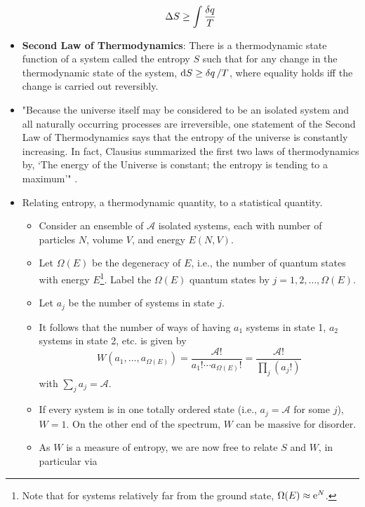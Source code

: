 \documentclass[../notes.tex]{subfiles}
\begin{document}
\begin{itemize}
    \begin{equation*}
        \Delta S \geq \int\frac{\var{q}}{T}
    \end{equation*}
    \item \textbf{Second Law of Thermodynamics}: There is a thermodynamic state function of a system called the entropy $S$ such that for any change in the thermodynamic state of the system, $\dd{S}\geq\var{q}/T$, where equality holds iff the change is carried out reversibly.
    \item "Because the universe itself may be considered to be an isolated system and all naturally occurring processes are irreversible, one statement of the Second Law of Thermodynamics says that the entropy of the universe is constantly increasing. In fact, Clausius summarized the first two laws of thermodynamics by, `The energy of the Universe is constant; the entropy is tending to a maximum'" \parencite[829]{bib:McQuarrieSimon}.
    \item Relating entropy, a thermodynamic quantity, to a statistical quantity.
    \begin{itemize}
        \item Consider an ensemble of $\mathcal{A}$ isolated systems, each with number of particles $N$, volume $V$, and energy $E(N,V)$.
        \item Let $\Omega(E)$ be the degeneracy of $E$, i.e., the number of quantum states with energy $E$\footnote{Note that for systems relatively far from the ground state, $\Omega(E)\approx\e[N]$.}. Label the $\Omega(E)$ quantum states by $j=1,2,\dots,\Omega(E)$.
        \item Let $a_j$ be the number of systems in state $j$.
        \item It follows that the number of ways of having $a_1$ systems in state 1, $a_2$ systems in state 2, etc. is given by
        \begin{equation*}
            W(a_1,\dots,a_{\Omega(E)}) = \frac{\mathcal{A}!}{a_1!\cdots a_{\Omega(E)}!} = \frac{\mathcal{A}!}{\prod_j(a_j!)}
        \end{equation*}
        with $\sum_ja_j=\mathcal{A}$.
        \item If every system is in one totally ordered state (i.e., $a_j=\mathcal{A}$ for some $j$), $W=1$. On the other end of the spectrum, $W$ can be massive for disorder.
        \item As $W$ is a measure of entropy, we are now free to relate $S$ and $W$, in particular via
        \begin{equation*}

\end{equation*}
\end{itemize}
\end{itemize}
\end{document}
